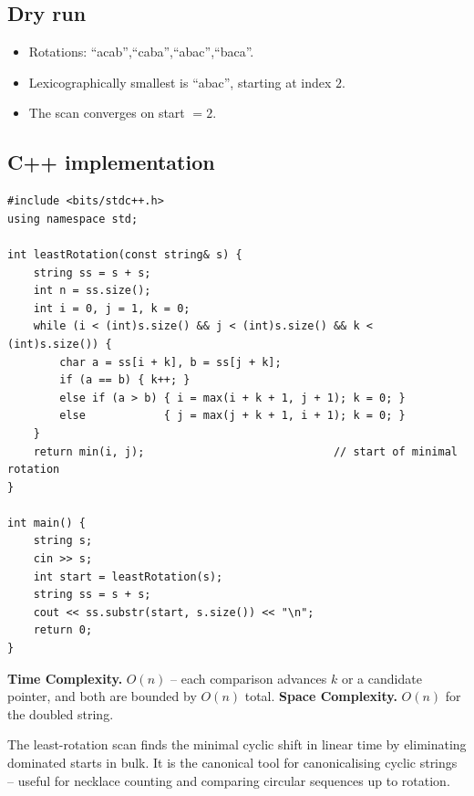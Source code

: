 \subsection*{Dry run}


\begin{itemize}
  \item Rotations: ``acab'',``caba'',``abac'',``baca''.
  \item Lexicographically smallest is ``abac'', starting at index $2$.
  \item The scan converges on start $=2$.
\end{itemize}

\subsection*{C++ implementation}

\begin{lstlisting}
#include <bits/stdc++.h>
using namespace std;

int leastRotation(const string& s) {
    string ss = s + s;
    int n = ss.size();
    int i = 0, j = 1, k = 0;
    while (i < (int)s.size() && j < (int)s.size() && k < (int)s.size()) {
        char a = ss[i + k], b = ss[j + k];
        if (a == b) { k++; }
        else if (a > b) { i = max(i + k + 1, j + 1); k = 0; }
        else            { j = max(j + k + 1, i + 1); k = 0; }
    }
    return min(i, j);                             // start of minimal rotation
}

int main() {
    string s;
    cin >> s;
    int start = leastRotation(s);
    string ss = s + s;
    cout << ss.substr(start, s.size()) << "\n";
    return 0;
}
\end{lstlisting}

\begin{complexitybox}
\textbf{Time Complexity.} $O(n)$ -- each comparison advances $k$ or a
candidate pointer, and both are bounded by $O(n)$ total. \textbf{Space
Complexity.} $O(n)$ for the doubled string.
\end{complexitybox}

\begin{takeawaybox}
The least-rotation scan finds the minimal cyclic shift in linear time by
eliminating dominated starts in bulk. It is the canonical tool for
canonicalising cyclic strings -- useful for necklace counting and
comparing circular sequences up to rotation.
\end{takeawaybox}
